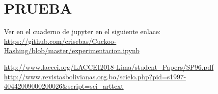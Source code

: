 \documentclass[final,a4paper,twocolumn,romanappendices]{IEEEtran}
\begin{document}
\begin{algorithm}
\caption{ funcion{\textunderscore}hash(funcion,clave) \label{ALG1_1}}
\end{algorithm}
\begin{algorithm}
	\caption{ Colocar( clave, tabla, cont, n) \label{ALG1_2}}
\end{algorithm}

\section{PRUEBA}
Ver en el cuaderno de jupyter en el siguiente enlace:  \url{https://github.com/crisebas/Cuckoo-Hashing/blob/master/experimentacion.ipynb}

\begin{thebibliography}{}
\bibitem{}\url{ http://www.laccei.org/LACCEI2018-Lima/student_Papers/SP96.pdf}
\bibitem{}\url{http://www.revistasbolivianas.org.bo/scielo.php?pid=s1997-40442009000200026&script=sci_arttext
}


\end{thebibliography}
\end{document}

